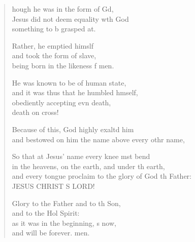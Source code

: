 \begin{verse}
  \begin{patverse}
    hough he was in the form of Gd,\Flex\\
    Jesus did not deem equality w\pointup{\i}th God\Med\\
    something to b grasped at.
    
    Rather, he emptied himslf\Flex\\
    and took the form of  slave,\Med\\
    being born in the likeness f men.
    
    He was known to be of human state,\Med\\
    and it was thus that he humbled h\pointup{\i}mself,\\
    obediently accepting evn death,\Med\\
    death on  cross!
    
    Because of this, God highly exaltd him\Med\\
    and bestowed on him the name above every othr name,
    
    So that at Jesus’ name every knee mst bend\Med\\
    in the heavens, on the earth, and under th earth,\\
    and every tongue proclaim to the glory of God th Father:\Med\\
    JESUS CHRIST S LORD!

    Glory to the Father and to th Son,\Med\\
    and to the Hol Spirit:\\
    as it was in the beginning, \pointup{\i}s now,\Med\\
    and will be forever. men.
  \end{patverse}
\end{verse}
